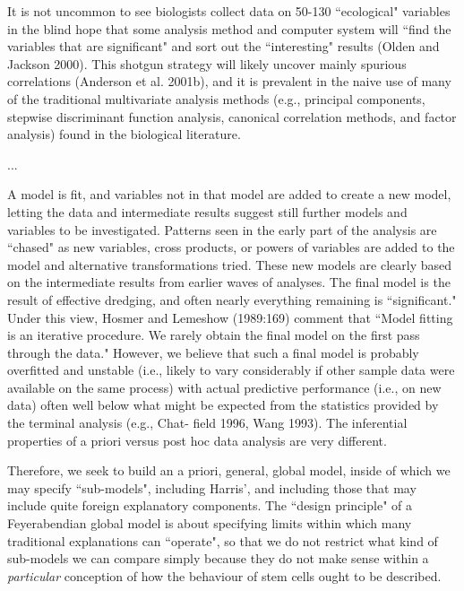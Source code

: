 \begin{longquote}
It is not uncommon to see biologists collect data on 50-130 ``ecological"
variables in the blind hope that some analysis method and computer system
will ``find the variables that are significant" and sort out the ``interesting" results
(Olden and Jackson 2000). This shotgun strategy will likely uncover mainly
spurious correlations (Anderson et al. 2001b), and it is prevalent in the naive
use of many of the traditional multivariate analysis methods (e.g., principal
components, stepwise discriminant function analysis, canonical correlation
methods, and factor analysis) found in the biological literature. 

...

 A model is fit, and variables not in that model are added to
create a new model, letting the data and intermediate results suggest still further models and variables to be investigated. Patterns seen in the early part
of the analysis are ``chased" as new variables, cross products, or powers of
variables are added to the model and alternative transformations tried. These
new models are clearly based on the intermediate results from earlier waves of
analyses. The final model is the result of effective dredging, and often nearly
everything remaining is ``significant." Under this view, Hosmer and Lemeshow
(1989:169) comment that ``Model fitting is an iterative procedure. We rarely
obtain the final model on the first pass through the data." However, we believe
that such a final model is probably overfitted and unstable (i.e., likely to vary
considerably if other sample data were available on the same process) with
actual predictive performance (i.e., on new data) often well below what might
be expected from the statistics provided by the terminal analysis (e.g., Chat-
field 1996, Wang 1993). The inferential properties of a priori versus post hoc
data analysis are very different.
\cite[p.18-38]{Burnham2002}
\end{longquote}

Therefore, we seek to build an a priori, general, global model, inside of which we may specify ``sub-models", including Harris', and including those that may include quite foreign explanatory components. The ``design principle" of a Feyerabendian global model is about specifying limits within which many traditional explanations can ``operate", so that we do not restrict what kind of sub-models we can compare simply because they do not make sense within a \textit{particular} conception of how the behaviour of stem cells ought to be described.

